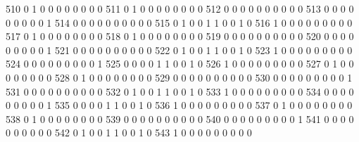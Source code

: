 \documentclass[compress,8pt]{beamer}
\begin{document}
\begin{frame}
\begin{Schunk}
  510      0       1   0              0        0    0       0       0   0   0
  511      0       1   0              0        0    0       0       0   0   0
  512      0       0   0              0        0    0       0       0   0   0
  513      0       0   0              0        0    0       0       0   0   1
  514      0       0   0              0        0    0       0       0   0   0
  515      0       1   0              0        1    1       0       0   1   0
  516      1       0   0              0        0    0       0       0   0   0
  517      0       1   0              0        0    0       0       0   0   0
  518      0       1   0              0        0    0       0       0   0   0
  519      0       0   0              0        0    0       0       0   0   0
  520      0       0   0              0        0    0       0       0   0   1
  521      0       0   0              0        0    0       0       0   0   0
  522      0       1   0              0        1    1       0       0   1   0
  523      1       0   0              0        0    0       0       0   0   0
  524      0       0   0              0        0    0       0       0   0   1
  525      0       0   0              0        1    1       0       0   1   0
  526      1       0   0              0        0    0       0       0   0   0
  527      0       1   0              0        0    0       0       0   0   0
  528      0       1   0              0        0    0       0       0   0   0
  529      0       0   0              0        0    0       0       0   0   0
  530      0       0   0              0        0    0       0       0   0   1
  531      0       0   0              0        0    0       0       0   0   0
  532      0       1   0              0        1    1       0       0   1   0
  533      1       0   0              0        0    0       0       0   0   0
  534      0       0   0              0        0    0       0       0   0   1
  535      0       0   0              0        1    1       0       0   1   0
  536      1       0   0              0        0    0       0       0   0   0
  537      0       1   0              0        0    0       0       0   0   0
  538      0       1   0              0        0    0       0       0   0   0
  539      0       0   0              0        0    0       0       0   0   0
  540      0       0   0              0        0    0       0       0   0   1
  541      0       0   0              0        0    0       0       0   0   0
  542      0       1   0              0        1    1       0       0   1   0
  543      1       0   0              0        0    0       0       0   0   0

\end{Schunk}
\end{frame}
\end{document}
